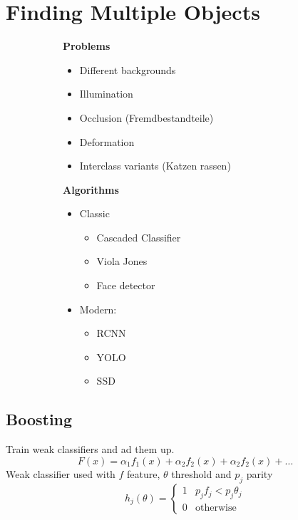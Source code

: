 \documentclass[x11names,11pt,a4paper]{article}
\theoremstyle{definition}
\begin{document}
\section{Finding Multiple Objects}
\begin{figure}[H]
     \centering
     \begin{subfigure}[b]{0.45\textwidth}
         \centering
         \textbf{Problems}
         \begin{itemize}
             \item Different backgrounds
             \item Illumination
             \item Occlusion (Fremdbestandteile)
             \item Deformation
             \item Interclass variants (Katzen rassen)
         \end{itemize}
     \end{subfigure}
     \hfill
     \begin{subfigure}[b]{0.45\textwidth}
         \centering
        \textbf{Algorithms}
        \begin{itemize}
            \item Classic
            \begin{itemize}
                \item Cascaded Classifier
                \item Viola Jones
                \item Face detector
            \end{itemize}
            \item Modern:
            \begin{itemize}
                \item RCNN
                \item YOLO
                \item SSD
            \end{itemize}
        \end{itemize}
     \end{subfigure}
\end{figure}


\subsection{Boosting}
Train weak classifiers and ad them up.
\begin{equation*}
	F(x) = \alpha_1 f_1(x) + \alpha_2 f_2(x) + \alpha_2 f_2(x) + \dots
\end{equation*}
Weak classifier used with $f$ feature, $\theta$ threshold and $p_j$ parity
\begin{equation*}
	h_j (\theta) = \left\{ \begin{matrix}
		1 & p_j f_j < p_j \theta_j\\
		0 & \text{otherwise}
		\end{matrix} \right.
\end{equation*}
\end{document}
